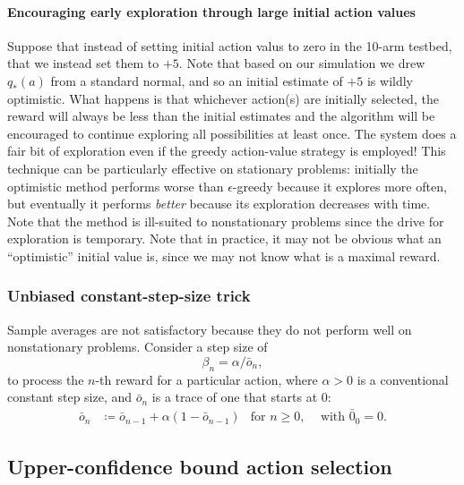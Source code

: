 \documentclass[12pt]{article}
\begin{document}
\paragraph{Encouraging early exploration through large initial action values} Suppose that instead of setting initial action valus to zero in the 10-arm testbed, that we instead set them to $+5$. Note that based on our simulation we drew $q_*(a)$ from a standard normal, and so an initial estimate of $+5$ is wildly optimistic. What happens is that whichever action(s) are initially selected, the reward will always be less than the initial estimates and the algorithm will be encouraged to continue exploring all possibilities at least once. The system does a fair bit of exploration even if the greedy action-value strategy is employed! This technique can be particularly effective on stationary problems: initially the optimistic method performs worse than $\epsilon$-greedy because it explores more often, but eventually it performs \emph{better} because its exploration decreases with time. Note that the method is ill-suited to nonstationary problems since the drive for exploration is temporary. Note that in practice, it may not be obvious what an ``optimistic'' initial value is, since we may not know what is a maximal reward.

\subsubsection{Unbiased constant-step-size trick} Sample averages are not satisfactory because they do not perform well on nonstationary problems. Consider a step size of
\[
  \beta_n = \alpha / \bar{o}_n,
\]
to process the $n$-th reward for a particular action, where $\alpha > 0$ is a conventional constant step size, and $\bar{o}_n$ is a trace of one that starts at 0:
\begin{align*}
  \bar{o}_n &\coloneqq \bar{o}_{n-1} + \alpha(1-\bar{o}_{n-1}) &\textrm{for } n \geq 0, \hspace{10pt} \textrm{ with } \bar{0}_0 = 0.
\end{align*}
\subsection{Upper-confidence bound action selection}
\end{document}
